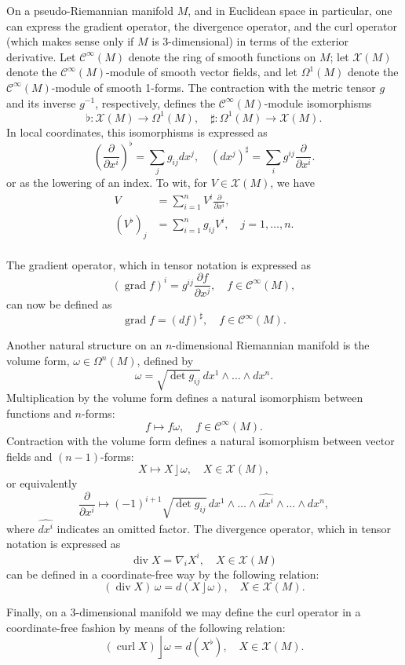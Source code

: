 \documentclass[12pt]{article}
\newcommand{\fM}{\mathcal{C}^{\infty}(M)}
\newcommand{\vfM}{\mathcal{X}(M)}
\newcommand{\ddx}[1]{\frac{\partial}{\partial x^{#1}}}
\newcommand{\ddxf}[2]{\frac{\partial #2}{\partial x^{#1}}}
\newcommand{\grad}{\operatorname{grad}}
\newcommand{\iprod}{\mathop{\rfloor}}
\newcommand{\Div}{\operatorname{div}}
\newcommand{\curl}{\operatorname{curl}}
\begin{document}
On a pseudo-Riemannian manifold $M$, and in Euclidean space in
particular, one can express the gradient operator, the divergence
operator, and the curl operator (which makes sense only if $M$ is
3-dimensional) in terms of the exterior derivative.  Let $\fM$ denote
the ring of smooth functions on $M$; let $\vfM$ denote the
$\fM$-module of smooth vector fields, and let $\Omega^1(M)$ denote the
$\fM$-module of smooth 1-forms. The contraction with the metric tensor
$g$ and its inverse $g^{-1}$, respectively, defines the
$\fM$-module isomorphisms
\[\flat:\vfM\to\Omega^1(M),\quad \sharp \colon \Omega^1(M)\to\vfM.\]
In local coordinates, this isomorphisms is expressed as
\[
\left(\ddx{i}\right)^\flat= \sum_j g_{ij} dx^j,\quad 
\left(dx^j\right)^\sharp = \sum_i g^{ij} \ddx{i}.
\]
or as the lowering of an index.  To wit, for $V\in\vfM$, we have
\begin{align*}
V&=\sum_{i=1}^n V^i\ddx{i},\\
(V^\flat)_j &= \sum_{i=1}^n g_{ij} V^i,\quad j=1,\ldots,n.\\
\end{align*}

The gradient operator, which in tensor notation is expressed as
$$(\grad f)^i = g^{ij} \ddxf{j}{f},\quad f\in \fM,$$
can now be defined as
$$\grad f = (df)^\sharp,\quad f \in\fM.$$

Another natural structure on an $n$-dimensional Riemannian manifold is
the volume form, $\omega \in \Omega^n(M)$, defined by $$\omega =
\sqrt{\det g_{ij}}\, dx^1\wedge\ldots\wedge dx^n.$$
Multiplication by
the volume form defines a natural isomorphism between functions and
$n$-forms: $$f\mapsto f\omega,\quad f\in \fM.$$
Contraction with the
volume form defines a natural isomorphism between vector fields and
$(n-1)$-forms: $$X\mapsto X\iprod \omega,\quad X\in \vfM,$$
or
equivalently $$\ddx{i} \mapsto (-1)^{i+1} \sqrt{\det g_{ij}}\,
dx^1\wedge\ldots \wedge \widehat{dx^i}\wedge\ldots \wedge dx^n,$$
where $\widehat{dx^i}$ indicates an omitted factor. The divergence
operator, which in tensor notation is expressed as $$\Div X = \nabla_i
X^i,\quad X\in \vfM$$
can be defined in a coordinate-free way by the following relation:
$$(\Div X)\, \omega = d(X\iprod \omega),\quad X\in \vfM.$$


Finally, on a $3$-dimensional manifold we may define the curl
operator in a coordinate-free fashion by means of the following relation:
$$(\curl X)\iprod \omega = d(X^\flat),\quad X\in \vfM.$$
\end{document}
